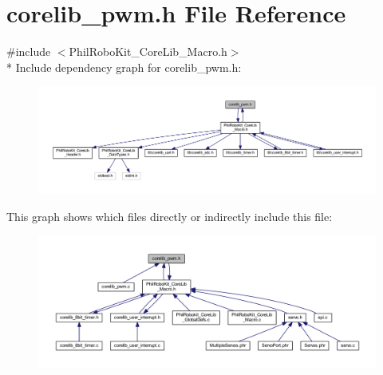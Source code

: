 \section{corelib\-\_\-pwm.\-h File Reference}
\label{corelib__pwm_8h}
{\ttfamily \#include $<$Phil\-Robo\-Kit\-\_\-\-Core\-Lib\-\_\-\-Macro.\-h$>$}\\*
Include dependency graph for corelib\-\_\-pwm.\-h\-:\nopagebreak
\begin{figure}[H]
\begin{center}
\leavevmode
\includegraphics[width=350pt]{corelib__pwm_8h__incl}
\end{center}
\end{figure}
This graph shows which files directly or indirectly include this file\-:\nopagebreak
\begin{figure}[H]
\begin{center}
\leavevmode
\includegraphics[width=350pt]{corelib__pwm_8h__dep__incl}
\end{center}
\end{figure}
